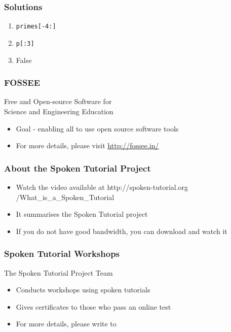 \documentclass[17pt,compress]{beamer}
\begin{document}
\begin{frame}
\frametitle{Solutions}
\label{sec-11}


\begin{enumerate}
\item \texttt{primes[-4:]}\pause
\vspace{8pt}
\item \texttt{p[:3]}\pause
\vspace{8pt}
\item False
\end{enumerate}
\end{frame}
\begin{frame}
\frametitle{FOSSEE}
{\color{blue}Free and Open-source Software for \\Science and Engineering Education} \\
\begin{itemize}
\item Goal - enabling all to use open source software tools
\item For more details, please visit {\color{blue}\url{http://fossee.in/}}
\end{itemize}
\end{frame}
\begin{frame}
\frametitle{About the Spoken Tutorial Project}
\begin{itemize}
\item Watch the video available at {\color{blue}http://spoken-tutorial.org /What\_is\_a\_Spoken\_Tutorial}
\item It summarises the Spoken Tutorial project \pause
\item If you do not have good bandwidth, you can download and watch it
\end{itemize}
\end{frame}
\begin{frame}
\frametitle{Spoken Tutorial Workshops}The Spoken Tutorial Project Team 
\begin{itemize}
\item Conducts workshops using spoken tutorials 
\item Gives certificates to those who pass an online test 
\item For more details, please write to \\ 
\end{itemize}
\end{frame}
\end{document}
